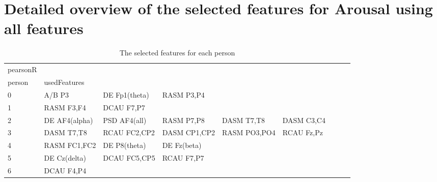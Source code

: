 \chapter{Detailed overview of the selected features for Arousal using all features}

\begin{landscape}
\begin{table}[]
\centering
\caption{The selected features for each person}
\begin{tabular}{l|llllllll}
pearsonR           &                      &                         &                      &                    &                       &                      &                 &                 \\
person             & usedFeatures         &                         &                      &                    &                       &                      &                 &                 \\
0                  & A/B P3               & DE Fp1(theta)           & RASM P3,P4           &                    &                       &                      &                 &                 \\
1                  & RASM F3,F4           & DCAU F7,P7              &                      &                    &                       &                      &                 &                 \\
2                  & DE AF4(alpha)        & PSD AF4(all)            & RASM P7,P8           & DASM T7,T8         & DASM C3,C4            &                      &                 &                 \\
3                  & DASM T7,T8           & RCAU FC2,CP2            & DASM CP1,CP2         & RASM PO3,PO4       & RCAU Fz,Pz            &                      &                 &                 \\
4                  & RASM FC1,FC2         & DE P8(theta)            & DE Fz(beta)          &                    &                       &                      &                 &                 \\
5                  & DE Cz(delta)         & DCAU FC5,CP5            & RCAU F7,P7           &                    &                       &                      &                 &                 \\
6                  & DCAU F4,P4           &                         &                      &                    &                       &                      &                 &                 \\

\end{tabular}
\end{table}
\end{landscape}
